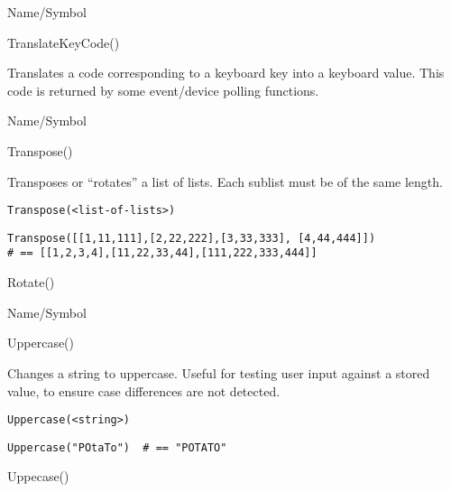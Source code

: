 \rl


\begin{desc}{Name/Symbol}
\item[Name/Symbol]  	TranslateKeyCode()

\item[Description] 	Translates a code corresponding to a keyboard key into a 
		keyboard value.  This code is returned by some event/device 
		polling functions.

\item[Usage]		

\item[Example]	

\item[See Also]	
\end{desc}

\rl


\begin{desc}{Name/Symbol}
\item[Name/Symbol]  	Transpose()

\item[Description] 	Transposes or ``rotates'' a list of lists.  Each sublist
	     	must be of the same length.

\item[Usage]       	
\begin{verbatim}
Transpose(<list-of-lists>)
\end{verbatim}

\item[Example]     	
\begin{verbatim}
Transpose([[1,11,111],[2,22,222],[3,33,333], [4,44,444]])
# == [[1,2,3,4],[11,22,33,44],[111,222,333,444]]
\end{verbatim}

\item[See Also]    	Rotate()
\end{desc}

\rl


\begin{desc}{Name/Symbol}
\item[Name/Symbol]  	Uppercase()

\item[Description]  	Changes a string to uppercase.  Useful for testing user
	      	input against a stored value, to ensure case differences
	      	are not detected.

\item[Usage]
\begin{verbatim}
Uppercase(<string>)
\end{verbatim}

\item[Example]     
\begin{verbatim}
Uppercase("POtaTo")  # == "POTATO"
\end{verbatim}

\item[See Also]     	Uppecase()
\end{desc}

